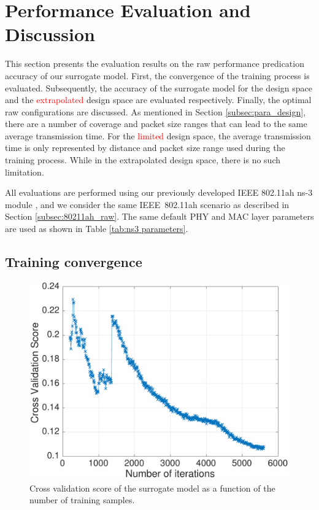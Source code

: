\section{Performance Evaluation and Discussion \label{sec:evaluation}}

This section presents the evaluation results on the \gls{raw} performance predication accuracy of our surrogate model. First, the  convergence of the training process is evaluated. Subsequently, the accuracy of the surrogate model for the design space and the \textcolor{red}{extrapolated} design space are evaluated respectively. Finally, the optimal \gls{raw} configurations are discussed. As mentioned in Section \ref{subsec:para_design}, there are a number of coverage and packet size ranges that can lead to the same average transmission time. For the \textcolor{red}{limited} design space, the average transmission time is only represented by distance and packet size range used during the training process. While in the extrapolated design space, there is no such limitation.

All evaluations are performed using our previously developed
IEEE 802.11ah ns-3 module \cite{WNS32016}, and we consider the same IEEE~802.11ah scenario as described in Section \ref{subsec:80211ah_raw}. The same default PHY and MAC layer parameters are used as shown in Table \ref{tab:ns3 parameters}.


\subsection{Training convergence}
\begin{figure}[t]
  \centering
  \includegraphics[width=0.75\columnwidth]{figures/throughput-cv}
  \caption{Cross validation score of the surrogate model as a function of the number of training samples. \label{fig:sumo-iteraton}}
\end{figure}

